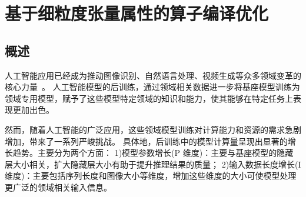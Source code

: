 
\chapter{基于细粒度张量属性的算子编译优化}

\label{chap:flashtensor}

\section{概述}



人工智能应用已经成为推动图像识别、自然语言处理、视频生成等众多领域变革的核心力量~\cite{radford2018gpt, radford2019gpt2, brown2020gpt3, achiam2023gpt4, touvron2023llama, touvron2023llama2, roziere2023codellama, MosaicML2023mpt30b, jiang2023mistralv1, peng2023yarn}。
人工智能模型的后训练，通过领域相关数据进一步将基座模型训练为领域专用模型，赋予了这些模型特定领域的知识和能力，使其能够在特定任务上表现更加出色。

然而，随着人工智能的广泛应用，这些领域模型训练对计算能力和资源的需求急剧增加，带来了一系列严峻挑战。
具体地，后训练中的模型计算量呈现出显著的增长趋势。主要分为两个方面：
1){模型参数增长}(P 维度)：主要与基座模型的隐藏层大小相关，扩大隐藏层大小有助于提升推理结果的质量；
2){输入数据长度增长}(I 维度)：主要包括序列长度和图像大小等维度，增加这些维度的大小可使模型处理更广泛的领域相关输入信息。

